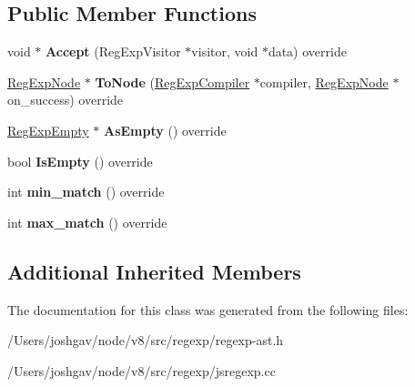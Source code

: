 \subsection*{Public Member Functions}
\begin{DoxyCompactItemize}
\item 
void $\ast$ {\bfseries Accept} (Reg\+Exp\+Visitor $\ast$visitor, void $\ast$data) override\hypertarget{classv8_1_1internal_1_1_reg_exp_empty_adb9b9eff91edaa55fa66350bb41d7ba6}{}\label{classv8_1_1internal_1_1_reg_exp_empty_adb9b9eff91edaa55fa66350bb41d7ba6}

\item 
\hyperlink{classv8_1_1internal_1_1_reg_exp_node}{Reg\+Exp\+Node} $\ast$ {\bfseries To\+Node} (\hyperlink{classv8_1_1internal_1_1_reg_exp_compiler}{Reg\+Exp\+Compiler} $\ast$compiler, \hyperlink{classv8_1_1internal_1_1_reg_exp_node}{Reg\+Exp\+Node} $\ast$on\+\_\+success) override\hypertarget{classv8_1_1internal_1_1_reg_exp_empty_a65ca3cea4c5bbe28078769d9998887aa}{}\label{classv8_1_1internal_1_1_reg_exp_empty_a65ca3cea4c5bbe28078769d9998887aa}

\item 
\hyperlink{classv8_1_1internal_1_1_reg_exp_empty}{Reg\+Exp\+Empty} $\ast$ {\bfseries As\+Empty} () override\hypertarget{classv8_1_1internal_1_1_reg_exp_empty_a8b93772851e79941082610b501605bbd}{}\label{classv8_1_1internal_1_1_reg_exp_empty_a8b93772851e79941082610b501605bbd}

\item 
bool {\bfseries Is\+Empty} () override\hypertarget{classv8_1_1internal_1_1_reg_exp_empty_af07b7a1f4f8ec094066fc53b4e5701bd}{}\label{classv8_1_1internal_1_1_reg_exp_empty_af07b7a1f4f8ec094066fc53b4e5701bd}

\item 
int {\bfseries min\+\_\+match} () override\hypertarget{classv8_1_1internal_1_1_reg_exp_empty_a8e3513c004366ac7d333fa462eb9b059}{}\label{classv8_1_1internal_1_1_reg_exp_empty_a8e3513c004366ac7d333fa462eb9b059}

\item 
int {\bfseries max\+\_\+match} () override\hypertarget{classv8_1_1internal_1_1_reg_exp_empty_ac4b2cb73f78ceb2fd6ebe6118c9a10cf}{}\label{classv8_1_1internal_1_1_reg_exp_empty_ac4b2cb73f78ceb2fd6ebe6118c9a10cf}

\end{DoxyCompactItemize}
\subsection*{Additional Inherited Members}


The documentation for this class was generated from the following files\+:\begin{DoxyCompactItemize}
\item 
/\+Users/joshgav/node/v8/src/regexp/regexp-\/ast.\+h\item 
/\+Users/joshgav/node/v8/src/regexp/jsregexp.\+cc\end{DoxyCompactItemize}
